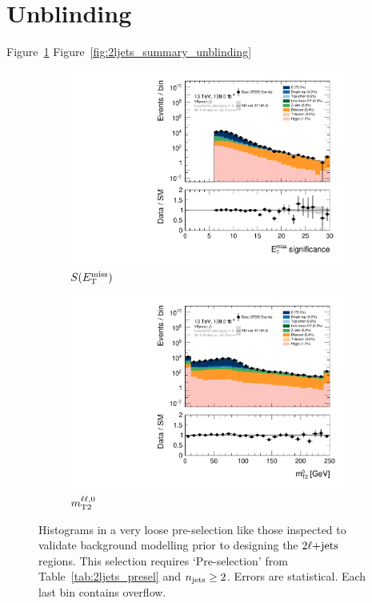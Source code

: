 \section{Unblinding}

Figure~\ref{fig:2ljets_prepre}
Figure~\ref{fig:2ljets_summary_unblinding}

\begin{figure}[tp]
\centering
\begin{subfigure}{0.48\textwidth}
\centering
\includegraphics[width=\textwidth]{figures/2ljets_prepre_met_Sign_VRpresel_2j_MCfakeslogY.pdf}
\caption{$S(E_\mathrm{T}^\mathrm{miss})$}
\end{subfigure}
\hfill
\begin{subfigure}{0.48\textwidth}
\centering
\includegraphics[width=\textwidth]{figures/2ljets_prepre_mt2leplsp_0_VRpresel_2j_MCfakeslogY.pdf}
\caption{$m_\mathrm{T2}^{\ell\ell,0}$}
\end{subfigure}
\caption[
Histograms in a very loose pre-selection
]{%
Histograms in a very loose pre-selection like those inspected to validate
background modelling prior to designing the $2\ell\mathrm{+jets}$ regions.
This selection requires `Pre-selection' from Table~\ref{tab:2ljets_presel} and
$n_\mathrm{jets} \geq 2$.
Errors are statistical.
Each last bin contains overflow.
}
\label{fig:2ljets_prepre}
\end{figure}

